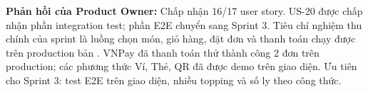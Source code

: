 \textbf{Phản hồi của Product Owner:} Chấp nhận 16/17 user story. US-20 được chấp nhận phần integration test; phần E2E chuyển sang Sprint 3. Tiêu chí nghiệm thu chính của sprint là luồng chọn món, giỏ hàng, đặt đơn và thanh toán chạy được trên production bản . VNPay đã thanh toán thử thành công 2 đơn trên production; các phương thức Ví, Thẻ, QR đã được demo trên giao diện. Ưu tiên cho Sprint 3: test E2E trên giao diện, nhiều topping và số ly theo công thức.